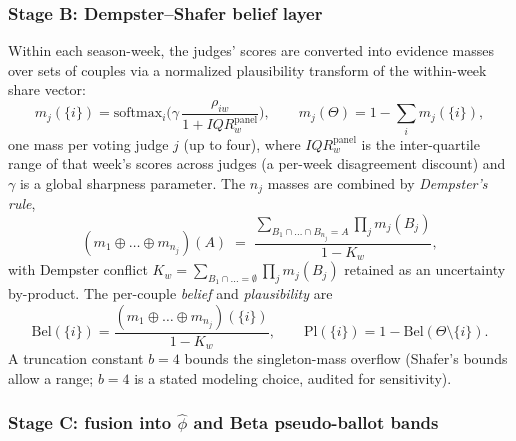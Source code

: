\documentclass[10pt]{article}
\begin{document}
\subsubsection{Stage B: Dempster--Shafer belief layer}

Within each season-week, the judges' scores are converted into evidence masses over sets
of couples via a normalized plausibility transform of the within-week share vector:
\begin{equation}
m_j(\{i\}) = \mathrm{softmax}_i\!\Big(\gamma\,\frac{\rho_{iw}}{1 + IQR^{\mathrm{panel}}_{w}}\Big),
\qquad m_j(\Theta) = 1 - \sum_{i} m_j(\{i\}),
\label{eq:mass}
\end{equation}
one mass per voting judge $j$ (up to four), where $IQR^{\mathrm{panel}}_{w}$ is the
inter-quartile range of that week's scores across judges (a per-week disagreement
discount) and $\gamma$ is a global sharpness parameter. The $n_j$ masses are combined by
\emph{Dempster's rule},
\begin{equation}
(m_1 \oplus \dots \oplus m_{n_j})(A) \;=\;
\frac{\sum_{B_1 \cap \dots \cap B_{n_j} = A} \prod_j m_j(B_j)}{1-K_w},
\end{equation}
with Dempster conflict $K_w = \sum_{B_1 \cap \dots = \emptyset}\prod_j m_j(B_j)$ retained
as an uncertainty by-product. The per-couple \emph{belief} and \emph{plausibility} are
\begin{equation}
\mathrm{Bel}(\{i\}) = \frac{(m_1\oplus\dots\oplus m_{n_j})(\{i\})}{1-K_w},
\qquad \mathrm{Pl}(\{i\}) = 1 - \mathrm{Bel}(\Theta \setminus \{i\}).
\end{equation}
A truncation constant $b=4$ bounds the singleton-mass overflow (Shafer's bounds allow a
range; $b=4$ is a stated modeling choice, audited for sensitivity).

\subsubsection{Stage C: fusion into $\hat\phi$ and Beta pseudo-ballot bands}
\end{document}
